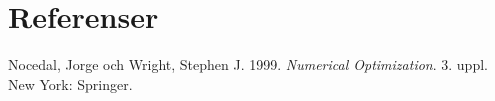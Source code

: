 \section{Referenser}
Nocedal, Jorge och Wright, Stephen J. 1999. \emph{Numerical Optimization}. 3. uppl. New York: Springer. 